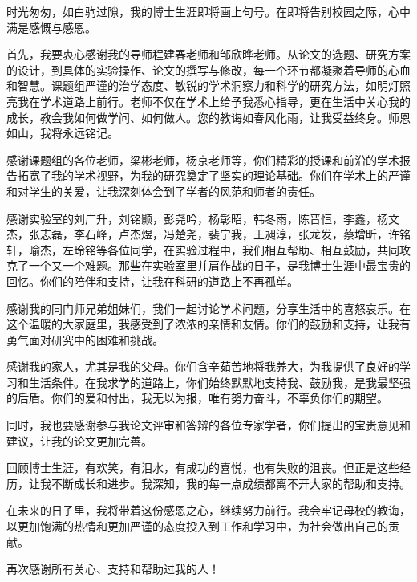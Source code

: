 \documentclass[
    anonymous,              %
    type = doctor,
  ]{njuthesis}
\begin{document}
\begin{acknowledgement}
  时光匆匆，如白驹过隙，我的博士生涯即将画上句号。在即将告别校园之际，心中满是感慨与感恩。
  
  首先，我要衷心感谢我的导师程建春老师和邹欣晔老师。从论文的选题、研究方案的设计，到具体的实验操作、论文的撰写与修改，每一个环节都凝聚着导师的心血和智慧。课题组严谨的治学态度、敏锐的学术洞察力和科学的研究方法，如明灯照亮我在学术道路上前行。老师不仅在学术上给予我悉心指导，更在生活中关心我的成长，教会我如何做学问、如何做人。您的教诲如春风化雨，让我受益终身。师恩如山，我将永远铭记。
  
  感谢课题组的各位老师，梁彬老师，杨京老师等，你们精彩的授课和前沿的学术报告拓宽了我的学术视野，为我的研究奠定了坚实的理论基础。你们在学术上的严谨和对学生的关爱，让我深刻体会到了学者的风范和师者的责任。
  
  感谢实验室的刘广升，刘铭颢，彭尧吟，杨彰昭，韩冬雨，陈晋恒，李鑫，杨文杰，张志磊，李石峰，卢杰煜，冯楚尧，裴宁我，王昶淳，张龙发，蔡增昕，许铭轩，喻杰，左玲铭等各位同学，在实验过程中，我们相互帮助、相互鼓励，共同攻克了一个又一个难题。那些在实验室里并肩作战的日子，是我博士生涯中最宝贵的回忆。你们的陪伴和支持，让我在科研的道路上不再孤单。
  
  感谢我的同门师兄弟姐妹们，我们一起讨论学术问题，分享生活中的喜怒哀乐。在这个温暖的大家庭里，我感受到了浓浓的亲情和友情。你们的鼓励和支持，让我有勇气面对研究中的困难和挑战。
  
  感谢我的家人，尤其是我的父母。你们含辛茹苦地将我养大，为我提供了良好的学习和生活条件。在我求学的道路上，你们始终默默地支持我、鼓励我，是我最坚强的后盾。你们的爱和付出，我无以为报，唯有努力奋斗，不辜负你们的期望。

  
  同时，我也要感谢参与我论文评审和答辩的各位专家学者，你们提出的宝贵意见和建议，让我的论文更加完善。
  
  回顾博士生涯，有欢笑，有泪水，有成功的喜悦，也有失败的沮丧。但正是这些经历，让我不断成长和进步。我深知，我的每一点成绩都离不开大家的帮助和支持。
  
  在未来的日子里，我将带着这份感恩之心，继续努力前行。我会牢记母校的教诲，以更加饱满的热情和更加严谨的态度投入到工作和学习中，为社会做出自己的贡献。
  
  再次感谢所有关心、支持和帮助过我的人！ 
\end{acknowledgement}


{
}



\end{document}
